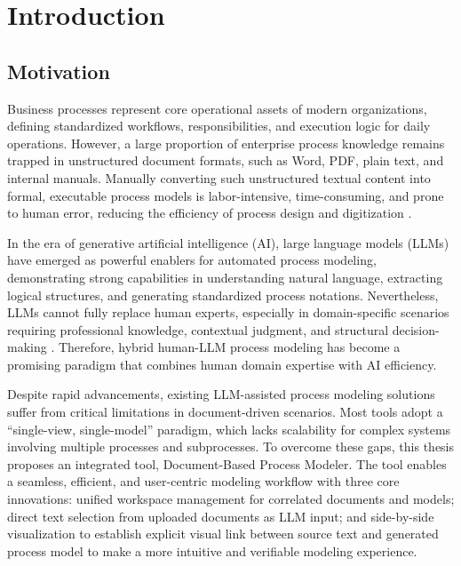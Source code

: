 \chapter{Introduction}
\label{sec:intro}

\section{Motivation}
\label{sec:intro:mo}

Business processes represent core operational assets of modern organizations, defining standardized workflows, responsibilities, and execution logic for daily operations. However, a large proportion of enterprise process knowledge remains trapped in unstructured document formats, such as Word, PDF, plain text, and internal manuals. Manually converting such unstructured textual content into formal, executable process models is labor-intensive, time-consuming, and prone to human error, reducing the efficiency of process design and digitization \cite{daclin2024gai4bm}.

In the era of generative artificial intelligence (AI), large language models (LLMs) have emerged as powerful enablers for automated process modeling, demonstrating strong capabilities in understanding natural language, extracting logical structures, and generating standardized process notations. Nevertheless, LLMs cannot fully replace human experts, especially in domain-specific scenarios requiring professional knowledge, contextual judgment, and structural decision-making \cite{klievtsova2024process}. Therefore, hybrid human-LLM process modeling has become a promising paradigm that combines human domain expertise with AI efficiency. 

Despite rapid advancements, existing LLM-assisted process modeling solutions suffer from critical limitations in document-driven scenarios. Most tools adopt a “single-view, single-model” paradigm, which lacks scalability for complex systems involving multiple processes and subprocesses. To overcome these gaps, this thesis proposes an integrated tool, Document-Based Process Modeler. The tool enables a seamless, efficient, and user-centric modeling workflow with three core innovations: unified workspace management for correlated documents and models; direct text selection from uploaded documents as LLM input; and side-by-side visualization to establish explicit visual link between source text and generated process model to make a more intuitive and verifiable modeling experience.

